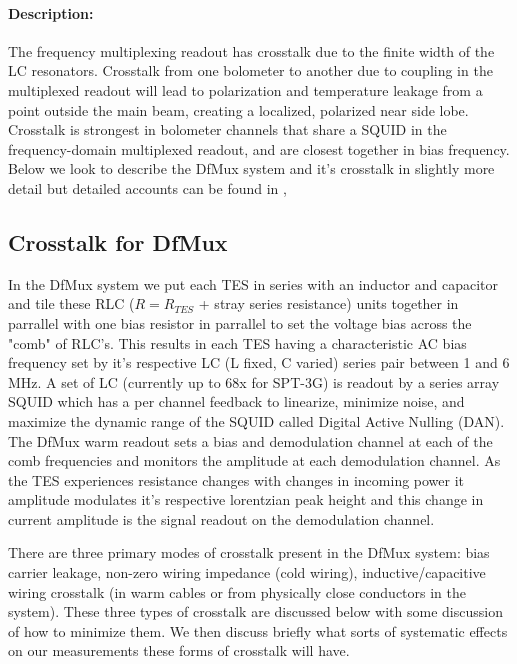 \paragraph{Description:}
The frequency multiplexing readout has crosstalk due to the finite width of the LC resonators.
Crosstalk from one bolometer to another due to coupling in the multiplexed readout will lead to polarization and temperature leakage from a point outside the main beam, creating a localized, polarized near side lobe. Crosstalk is strongest in bolometer channels that share a SQUID in the frequency-domain multiplexed readout, and are closest together in bias frequency. Below we look to describe the DfMux system and it's crosstalk in slightly more detail but detailed accounts can be found in \cite{Barron_Thesis}, \cite{DfMux_Dobbs2012}

\subsection{Crosstalk for DfMux}

In the DfMux system we put each TES in series with an inductor and capacitor and tile these RLC ($R=R_{TES}$ + stray series resistance) units together in parrallel with one bias resistor in parrallel to set the voltage bias across the "comb" of RLC's. This results in each TES having a characteristic AC bias frequency set by it's respective LC (L fixed, C varied) series pair between 1 and 6 MHz. A set of LC (currently up to 68x for SPT-3G\cite{SPT3G_DfMux_Overview}) is readout by a series array SQUID which has a per channel feedback to linearize, minimize noise, and maximize the dynamic range of the SQUID called Digital Active Nulling (DAN)\cite{DfMux_LC_Production}. The DfMux warm readout sets a bias and demodulation channel at each of the comb frequencies and monitors the amplitude at each demodulation channel. As the TES experiences resistance changes with changes in incoming power it amplitude modulates it's respective lorentzian peak height and this change in current amplitude is the signal readout on the demodulation channel. 

There are three primary modes of crosstalk present in the DfMux system: bias carrier leakage, non-zero wiring impedance (cold wiring), inductive/capacitive wiring crosstalk (in warm cables or from physically close conductors in the system). These three types of crosstalk are discussed below with some discussion of how to minimize them. \cite{DAN_Crosstalk_Memo} We then discuss briefly what sorts of systematic effects on our measurements these forms of crosstalk will have. 

